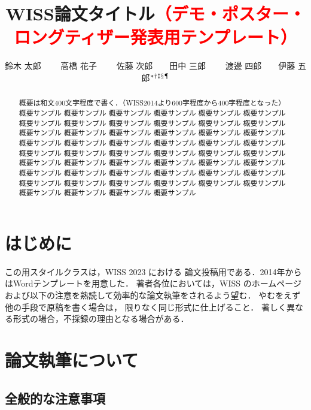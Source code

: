 \documentclass[twoside]{wiss}
\begin{document}
\title{WISS論文タイトル\textcolor{red}{（デモ・ポスター・ロングティザー発表用テンプレート）}}
\etitle{}%
%
%
%
\author{鈴木 太郎 　　高橋 花子
　　佐藤 次郎　　田中 三郎
　　渡邊 四郎　　伊藤 五郎${}^* {}^\dag {}^\ddag {}^\mathsection
{}^\mathparagraph$}

\begin{abstract}
概要は和文400文字程度で書く．（WISS2014より600字程度から400字程度となった）
概要サンプル 概要サンプル 概要サンプル 概要サンプル 概要サンプル 概要サンプル
概要サンプル 概要サンプル 概要サンプル 概要サンプル 概要サンプル 概要サンプル
概要サンプル 概要サンプル 概要サンプル 概要サンプル 概要サンプル 概要サンプル
概要サンプル 概要サンプル 概要サンプル 概要サンプル 概要サンプル 概要サンプル
概要サンプル 概要サンプル 概要サンプル 概要サンプル 概要サンプル 概要サンプル
概要サンプル 概要サンプル 概要サンプル 概要サンプル 概要サンプル 概要サンプル
概要サンプル 概要サンプル 概要サンプル 概要サンプル 概要サンプル 概要サンプル
概要サンプル 概要サンプル 概要サンプル 概要サンプル 概要サンプル 概要サンプル
概要サンプル 概要サンプル 概要サンプル 概要サンプル
\end{abstract}

\maketitle

\section{はじめに}

この\LaTeXe{}用スタイルクラスは，WISS 2023 における
論文投稿用である．2014年からはWordテンプレートを用意した．
著者各位においては，WISS のホームページ\cite{wiss}
および以下の注意を熟読して効率的な論文執筆をされるよう望む．
やむをえず他の手段で原稿を書く場合は，
限りなく同じ形式に仕上げること．
著しく異なる形式の場合，不採録の理由となる場合がある．

\section{論文執筆について}

\subsection{全般的な注意事項}
\end{document}
